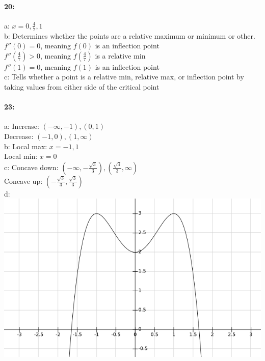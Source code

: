 \documentclass[12pt]{article}
\begin{document}
    \paragraph*{20:\\}
            a: $x = {0, \frac{4}{7}, 1}$\\
            b: Determines whether the points are a relative maximum or minimum or other.\\
            $f''(0) = 0$, meaning $f(0)$ is an inflection point\\
            $f''(\frac{4}{7}) > 0$, meaning $f(\frac{4}{7})$ is a relative min\\
            $f''(1) = 0$, meaning $f(1)$ is an inflection point\\
            c: Tells whether a point is a relative min, relative max, or inflection point by taking values from either side of the critical point

    \paragraph*{23:\\}
            a: Increase: $(-\infty, -1), (0, 1)$\\Decrease: $(-1, 0), (1, \infty)$\\
            b: Local max: $x = {-1, 1}$\\Local min: $x = {0}$\\
            c: Concave down: $(-\infty, -\frac{\sqrt{3}}{3}), (\frac{\sqrt{3}}{3}, \infty)$\\
            Concave up: $(-\frac{\sqrt{3}}{3}, \frac{\sqrt{3}}{3})$\\
            d:\\ \includegraphics[scale=.333]{23.png}\\\\
\end{document}

